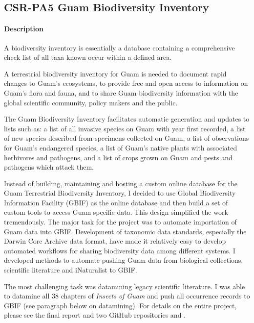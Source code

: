 \subsection{CSR-PA5 Guam Biodiversity Inventory}
\begin{refsection}
	
	\paragraph{Description}
	
	A biodiversity inventory is essentially a database containing a comprehensive
	check list of all taxa known occur within a defined area.
	
	A terrestrial biodiversity inventory for Guam is needed to document
	rapid changes to Guam's ecosystems, to provide free
	and open access to information on Guam's flora and
	fauna, and to share Guam biodiversity information with the global
	scientific community, policy makers and the public.
	
	The Guam Biodiversity Inventory facilitates automatic generation
	and updates to lists such as: a list of all invasive species on Guam
	with year first recorded, a list of new species described from specimens
	collected on Guam, a list of observations for Guam's
	endangered species, a list of Guam's native plants
	with associated herbivores and pathogens, and a list of crops grown
	on Guam and pests and pathogens which attack them.
	
	Instead of building, maintaining and hosting a custom online database for the Guam Terrestrial Biodiversity Inventory, I decided to use Global Biodiversity Information Facility (GBIF) as the online database and then build a set of custom tools to access Guam specific data. This design simplified the work tremendously. The major task for the project was to automate importation of Guam data into GBIF. Development of taxonomic data standards, especially the Darwin Core Archive data format, have made it relatively easy to develop automated workflows for sharing biodiversity data among different systems. I developed methods to automate pushing Guam data from biological collections, scientific literature and iNaturalist to GBIF.
	
	The most challenging task was datamining legacy scientific literature. I was able to datamine all 38 chapters of \textit{Insects of Guam} and push all occurrence records to GBIF (see paragraph below on datamining). For details on the entire project, please see the final report \cite{mooreFinalReportMcIntireStennis2023} and two GitHub repositories \cite{mooreGitHubRepositoryMcIntireStennis2021}and \cite{moore_github_2019-1}.	 
	

\end{refsection}
